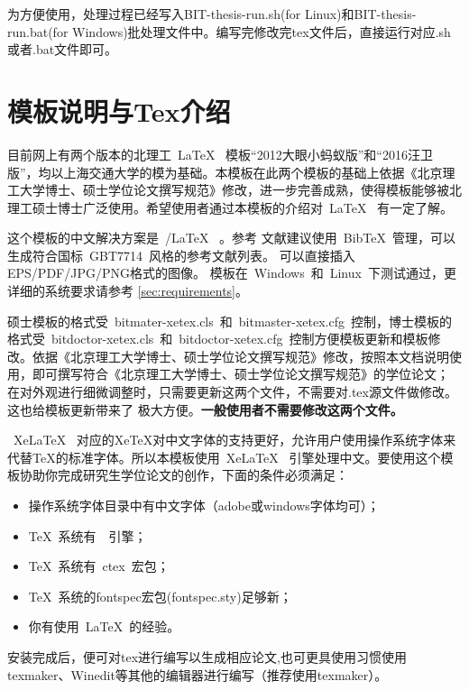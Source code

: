 为方便使用，处理过程已经写入BIT-thesis-run.sh(for Linux)和BIT-thesis-run.bat(for Windows)批处理文件中。编写完修改完tex文件后，直接运行对应.sh或者.bat文件即可。


\section{模板说明与Tex介绍}
\label{sec:features}
 
目前网上有两个版本的北理工~\LaTeX~ 模板“2012大眼小蚂蚁版”和“2016汪卫版”，均以上海交通大学的模为基础。本模板在此两个模板的基础上依据《北京理工大学博士、硕士学位论文撰写规范》修改，进一步完善成熟，使得模板能够被北理工硕士博士广泛使用。希望使用者通过本模板的介绍对~\LaTeX~ 有一定了解。

这个模板的中文解决方案是~\XeTeX/\LaTeX~ 。参考
文献建议使用~BibTeX~管理，可以生成符合国标~GBT7714~风格的参考文献列表。
可以直接插入EPS/PDF/JPG/PNG格式的图像。
模板在~Windows~和~Linux~下测试通过，更详细的系统要求请参考
\ref{sec:requirements}。

硕士模板的格式受~bitmater-xetex.cls~和~bitmaster-xetex.cfg~控制，博士模板的格式受~bitdoctor-xetex.cls~和~bitdoctor-xetex.cfg~控制方便模板更新和模板修改。依据《北京理工大学博士、硕士学位论文撰写规范》修改，按照本文档说明使用，即可撰写符合《北京理工大学博士、硕士学位论文撰写规范》的学位论文；
在对外观进行细微调整时，只需要更新这两个文件，不需要对.tex源文件做修改。这也给模板更新带来了
极大方便。\textbf{一般使用者不需要修改这两个文件。}
 
~XeLaTeX~ 对应的XeTeX对中文字体的支持更好，允许用户使用操作系统字体来代替TeX的标准字体。所以本模板使用~XeLaTeX~ 引擎处理中文。要使用这个模板协助你完成研究生学位论文的创作，下面的条件必须满足：

\begin{itemize}
\item \inv 操作系统字体目录中有中文字体（adobe或windows字体均可）；
\item \inv \TeX~系统有~\XeTeX~引擎；
\item \inv \TeX~系统有~ctex~宏包；
\item \inv \TeX~系统的fontspec宏包(fontspec.sty)足够新；
\item \inv 你有使用~\LaTeX~的经验。
\end{itemize}

安装完成后，便可对tex进行编写以生成相应论文,也可更具使用习惯使用texmaker、Winedit等其他的编辑器进行编写（推荐使用texmaker）。



